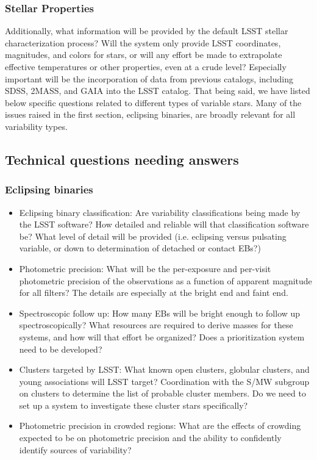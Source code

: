 \subsubsection{Stellar Properties }
Additionally, what information will
 be provided by the default LSST stellar characterization process? Will the system only provide LSST coordinates, magnitudes, and colors for stars, or will any effort be made to extrapolate effective temperatures or other properties, even at a crude level? Especially important will be the incorporation of data from previous catalogs, including SDSS, 2MASS, and GAIA into the LSST catalog. 
That being said, we have listed below specific questions related to different types of variable stars. Many of the issues raised in the first section, eclipsing binaries, are broadly relevant for all variability types. 

\subsection{Technical questions needing answers}
\subsubsection{Eclipsing binaries }
\begin{itemize}
\item{Eclipsing binary classification: Are variability classifications being made by the LSST software? How detailed and reliable will that classification software be? What level of detail will be provided (i.e. eclipsing versus pulsating variable, or down to determination of detached or contact EBs?) }
\item{Photometric precision: What will be the per-exposure and per-visit photometric precision of the observations as a function of apparent magnitude for all filters? The details are especially at the bright end and faint end. }
\item{Spectroscopic follow up: How many EBs will be bright enough to follow up spectroscopically? What resources are required to derive masses for these systems, and how will that effort be organized? Does a prioritization system need to be developed? }
\item{Clusters targeted by LSST: What known open clusters, globular clusters, and young associations will LSST target? Coordination with the S/MW subgroup on clusters to determine the list of probable cluster members. Do we need to set up a system to investigate these cluster stars specifically? }
\item{Photometric precision in crowded regions: What are the effects of crowding expected to be on photometric precision and the ability to confidently identify sources of variability? }
\end{itemize}

